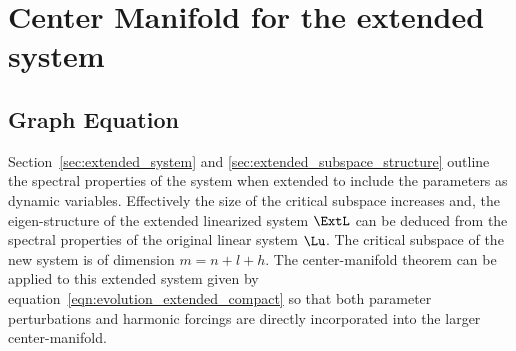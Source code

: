\section{Center Manifold for the extended system}
\label{sec:center_manifold_derivation}

\subsection{Graph Equation}
\label{sec:graph_equation}

Section~\ref{sec:extended_system} and \ref{sec:extended_subspace_structure} outline the spectral properties of the system when extended to include the parameters as dynamic variables. Effectively the size of the critical subspace increases and, the eigen-structure of the extended linearized system $\ExtL$ can be deduced from the spectral properties of the original linear system $\Lu$. The critical subspace of the new system is of dimension $m=n+l+h$. The center-manifold theorem can be applied to this extended system given by equation~\eqref{eqn:evolution_extended_compact} so that both parameter perturbations and harmonic forcings are directly incorporated into the larger center-manifold. 


